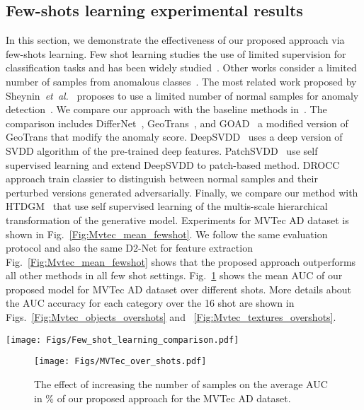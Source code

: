 \documentclass[journal]{IEEEtran}
\newcommand \andothers {\textit{et~al.}}
\let\MYoriglatexcaption\caption
\renewcommand{\caption}[2][\relax]{\MYoriglatexcaption[#2]{#2}}
\begin{document}
\subsection{Few-shots learning experimental results}
\label{Sec:Fewshot_results}
In this section, we demonstrate the effectiveness of our proposed approach via few-shots learning. Few shot learning studies the use of limited supervision for classification tasks and has been widely studied~\cite{chen2019closer,wang2020generalizing}. Other works consider a limited number of samples from anomalous classes~\cite{pang2018learning,pang2019deep}. The most related work proposed by Sheynin~\andothers~\cite{sheynin2021hierarchical} proposes to use a limited number of normal samples for anomaly detection~\cite{sheynin2021hierarchical}. We compare our approach with the baseline methods in~\cite{sheynin2021hierarchical}. The comparison includes DifferNet~\cite{rudolph2021same}, GeoTrans~\cite{geotrans}, and GOAD~\cite{bergman2020classification} a modified version of GeoTrans that modify the anomaly score. DeepSVDD~\cite{ruff2018deep} uses a deep version of SVDD algorithm of the pre-trained deep features. PatchSVDD~\cite{defard2020padim} use self supervised learning and extend DeepSVDD to patch-based method. DROCC~\cite{goyal2020drocc} approach train classier to distinguish between normal samples and their perturbed versions generated adversarially. Finally, we compare our method with HTDGM~\cite{sheynin2021hierarchical} that use self supervised learning of the multis-scale hierarchical transformation of the generative model. Experiments for MVTec AD dataset is shown in Fig.~\ref{Fig:Mvtec_mean_fewshot}. We follow the same evaluation protocol and also the same D2-Net for feature extraction Fig.~\ref{Fig:Mvtec_mean_fewshot} shows that the proposed approach outperforms all other methods in all few shot settings. Fig.~\ref{Fig:Mvtec_mean_overshots} shows the mean AUC of our proposed model for MVTec AD dataset over different shots. More details about the AUC accuracy for each category over the 16 shot are shown in Figs.~\ref{Fig:Mvtec_objects_overshots} and ~\ref{Fig:Mvtec_textures_overshots}.


\begin{figure*}[!h]
	\centering
	\texttt{[image: Figs/Few\_shot\_learning\_comparison.pdf]}
	\caption{AUC in \% performance of the MVTec AD datase, for One shot, Five Shot, and Ten Shot settings.}
	\label{Fig:Mvtec_mean_fewshot}
\end{figure*} 
\begin{figure}[!h]
	\texttt{[image: Figs/MVTec\_over\_shots.pdf]}
	\caption{The effect of increasing the number of samples on the average AUC in \% of our proposed approach for the MVTec AD dataset.}
	\label{Fig:Mvtec_mean_overshots}
\end{figure} 
\end{document}
